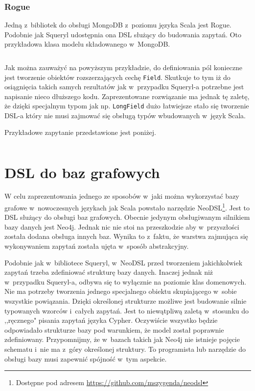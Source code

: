 \documentclass[brudnopis]{xmgr}
\begin{document}
\subsection{Rogue}

Jedną z~bibliotek do obsługi MongoDB z~poziomu języka Scala jest Rogue. Podobnie jak Squeryl udostępnia ona DSL służący do budowania zapytań. Oto przykładowa klasa modelu składowanego w~MongoDB.

\inputminted{scala}{listings/scala/rogue-model.scala}

Jak można zauważyć na powyższym przykładzie, do definiowania pól konieczne jest tworzenie obiektów rozszerzających cechę \texttt{Field}. Skutkuje to tym iż do osiągnięcia takich samych rezultatów jak w~przypadku Squeryl-a potrzebne jest napisanie nieco dłuższego kodu. Zaprezentowane rozwiązanie ma jednak tę zaletę, że dzięki specjalnym typom jak np. \texttt{LongField} dużo łatwiejsze stało się tworzenie DSL-a który nie musi zajmować się obsługą typów wbudowanych w~język Scala.

\medskip\noindent Przykładowe zapytanie przedstawione jest poniżej.

\inputminted{scala}{listings/scala/rogue-query.scala}

\chapter{DSL do baz grafowych}

W celu zaprezentowania jednego ze sposobów w~jaki można wykorzystać bazy grafowe w~nowoczesnych językach jak Scala powstało narzędzie NeoDSL\footnote{Dostępne pod adresem \url{https://github.com/mszygenda/neodsl}}. Jest to DSL służący do obsługi baz grafowych.
Obecnie jedynym obsługiwanym silnikiem bazy danych jest Neo4j. Jednak nic nie stoi na przeszkodzie aby w~przyszłości została dodana obsługa innych baz. Wynika to z~faktu, że warstwa zajmująca się wykonywaniem zapytań została ujęta w~sposób abstrakcyjny.

Podobnie jak w~bibliotece Squeryl, w~NeoDSL przed tworzeniem jakichkolwiek zapytań trzeba zdefiniować strukturę bazy danych. Inaczej jednak niż w~przypadku Squeryl-a, odbywa się to wyłącznie na poziomie klas domenowych. Nie ma potrzeby tworzenia jednego specjalnego obiektu skupiającego w~sobie wszystkie powiązania. Dzięki określonej strukturze możliwe jest budowanie silnie typowanych wzorców i~całych zapytań. Jest to niewątpliwą zaletą w~stosunku do ,,ręcznego" pisania zapytań języka Cypher. Oczywiście wszystko będzie odpowiadało strukturze bazy pod warunkiem, że model został poprawnie zdefiniowany. Przypomnijmy, że w~bazach takich jak Neo4j nie istnieje pojęcie schematu i~nie ma z~góry określonej struktury. To programista lub narzędzie do obsługi bazy musi zapewnić spójność w~tym aspekcie.
\end{document}
